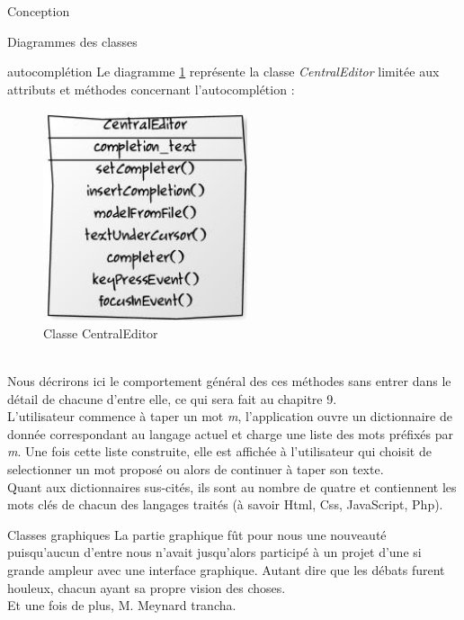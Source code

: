 \documentclass[a4paper, 12pt]{report}
\begin{document}
\begin{part}{Conception}
\begin{chapter}{Diagrammes des classes}
\begin{section}{\Gls{autocomplétion}}
				Le diagramme \ref{orangina} représente la classe \emph{CentralEditor} limitée aux attributs et méthodes concernant
				l'\gls{autocomplétion} :
				\begin{figure}[ht]
					\begin{center}
						\includegraphics[width=6cm]{images/classesAutoCompletion.jpg}
						\caption{Classe CentralEditor}
						\label{orangina}
					\end{center}
				\end{figure}~\\

				Nous décrirons ici le comportement général des ces méthodes sans entrer dans le détail de chacune d'entre elle,
				ce qui sera fait au chapitre 9.\\

				L'utilisateur commence à taper un mot \emph{m}, l'application ouvre un dictionnaire de donnée correspondant au langage actuel et 
				charge une liste des mots préfixés par \emph{m}. Une fois cette liste construite, elle est affichée à l'utilisateur qui choisit de
				selectionner un mot proposé ou alors de continuer à taper son texte.\\

				Quant aux dictionnaires sus-cités, ils sont au nombre de quatre et contiennent les mots clés de chacun des langages traités (à savoir
				\gls{Html}, \gls{Css}, \gls{JavaScript}, \gls{Php}).

			\end{section}
			\begin{section}{Classes graphiques}
				La partie graphique fût pour nous une nouveauté puisqu'aucun d'entre nous n'avait jusqu'alors participé à un projet d'une si grande
				ampleur avec une interface graphique. Autant dire que les débats furent houleux, chacun ayant sa propre vision des choses.\\
				Et une fois de plus, M. Meynard trancha.\\


\end{section}
\end{chapter}
\end{part}
\end{document}
